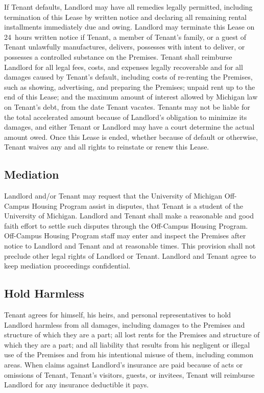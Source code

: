 \documentclass{article}
\begin{document}
If Tenant defaults, Landlord may have all remedies legally permitted, including
termination of this Lease by written notice and declaring all remaining rental
installments immediately due and owing. Landlord may terminate this Lease on
24~hours written notice if Tenant, a member of Tenant’s family, or a guest of
Tenant unlawfully manufactures, delivers, possesses with intent to deliver, or
possesses a controlled substance on the Premises. Tenant shall reimburse
Landlord for all legal fees, costs, and expenses legally recoverable and for all
damages caused by Tenant’s default, including costs of re-renting the Premises,
such as showing, advertising, and preparing the Premises; unpaid rent up to the
end of this Lease; and the maximum amount of interest allowed by Michigan law on
Tenant’s debt, from the date Tenant vacates. Tenants may not be liable for the
total accelerated amount because of Landlord’s obligation to minimize its
damages, and either Tenant or Landlord may have a court determine the actual
amount owed. Once this Lease is ended, whether because of default or otherwise,
Tenant waives any and all rights to reinstate or renew this Lease.

\subsection{Mediation}
Landlord and/or Tenant may request that the University of Michigan Off-Campus
Housing Program assist in disputes,  that Tenant is a
student of the University of Michigan. Landlord and Tenant shall make a
reasonable and good faith effort to settle such disputes through the Off-Campus
Housing Program. Off-Campus Housing Program staff may enter and inspect the
Premises after notice to Landlord and Tenant and at reasonable times. This
provision shall not preclude other legal rights of Landlord or Tenant. Landlord
and Tenant agree to keep mediation proceedings confidential.

\subsection{Hold Harmless}
Tenant agrees for himself, his heirs, and personal representatives to hold
Landlord harmless from all damages, including damages to the Premises and
structure of which they are a part; all lost rents for the Premises and
structure of which they are a part; and all liability that results from his
negligent or illegal use of the Premises and from his intentional misuse of
them, including common areas. When claims against Landlord’s insurance are paid
because of acts or omissions of Tenant, Tenant’s visitors, guests, or invitees,
Tenant will reimburse Landlord for any insurance deductible it pays.
\end{document}
